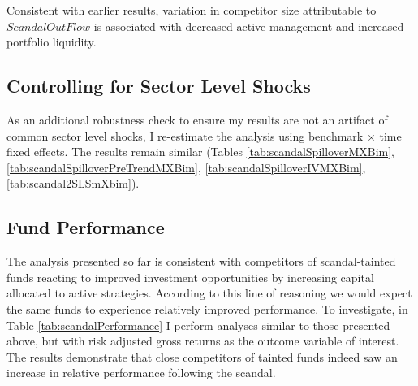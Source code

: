\documentclass[openany]{book}
\theoremstyle{definition}
\theoremstyle{definition}
\theoremstyle{definition}
\theoremstyle{remark}
\begin{document}
Consistent with earlier results, variation in competitor size
attributable to \(ScandalOutFlow\) is associated with decreased active
management and increased portfolio liquidity.

\subsection{Controlling for Sector Level Shocks}

As an additional robustness check to ensure my results are not an
artifact of common sector level shocks, I re-estimate the analysis using
benchmark \(\times\) time fixed effects. The results remain similar
(Tables \ref{tab:scandalSpilloverMXBim},
\ref{tab:scandalSpilloverPreTrendMXBim},
\ref{tab:scandalSpilloverIVMXBim}, \ref{tab:scandal2SLSmXbim}).

\subsection{Fund Performance}

The analysis presented so far is consistent with competitors of
scandal-tainted funds reacting to improved investment opportunities by
increasing capital allocated to active strategies. According to this
line of reasoning we would expect the same funds to experience
relatively improved performance. To investigate, in Table
\ref{tab:scandalPerformance} I perform analyses similar to those
presented above, but with risk adjusted gross returns as the outcome
variable of interest. The results demonstrate that close competitors of
tainted funds indeed saw an increase in relative performance following
the scandal.
\end{document}
